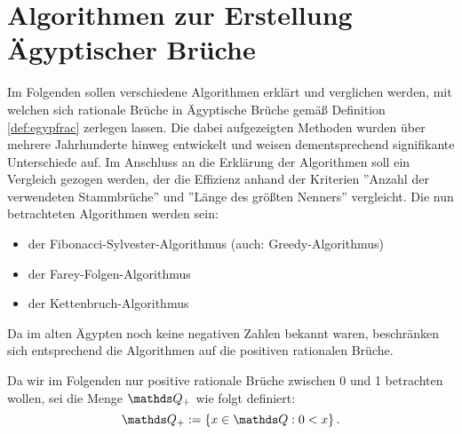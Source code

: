 \section{Algorithmen zur Erstellung Ägyptischer Brüche}\label{sec:algorithmen}
Im Folgenden sollen verschiedene Algorithmen erklärt und verglichen werden, mit welchen sich rationale Brüche in Ägyptische Brüche gemäß Definition \ref{def:egypfrac} zerlegen lassen. Die dabei aufgezeigten Methoden wurden über mehrere Jahrhunderte hinweg entwickelt und weisen dementsprechend signifikante Unterschiede auf. Im Anschluss an die Erklärung der Algorithmen soll ein Vergleich gezogen werden, der die Effizienz anhand der Kriterien ''Anzahl der verwendeten Stammbrüche'' und ''Länge des größten Nenners'' vergleicht.
Die nun betrachteten Algorithmen werden sein:
\begin{itemize}
	\item der Fibonacci-Sylvester-Algorithmus (auch: Greedy-Algorithmus)
	\item der Farey-Folgen-Algorithmus
	\item der Kettenbruch-Algorithmus
\end{itemize}

Da im alten Ägypten noch keine negativen Zahlen bekannt waren, beschränken sich entsprechend die Algorithmen auf die positiven rationalen Brüche.
\begin{def1}
	Da wir im Folgenden nur positive rationale Brüche zwischen 0 und 1 betrachten wollen, sei die Menge $\Q_+$ wie folgt definiert:
	$$\Q_+ := \left\{x \in \Q: 0<x\right\}.$$
\end{def1}